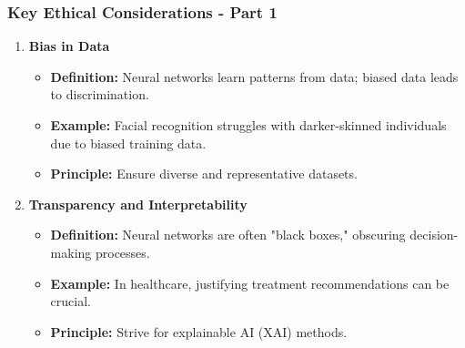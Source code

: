 \documentclass[aspectratio=169]{beamer}
\begin{document}
\begin{frame}[fragile]
    \frametitle{Key Ethical Considerations - Part 1}
    \begin{enumerate}
        \item \textbf{Bias in Data}
            \begin{itemize}
                \item \textbf{Definition:} Neural networks learn patterns from data; biased data leads to discrimination.
                \item \textbf{Example:} Facial recognition struggles with darker-skinned individuals due to biased training data.
                \item \textbf{Principle:} Ensure diverse and representative datasets.
            \end{itemize}
        
        \item \textbf{Transparency and Interpretability}
            \begin{itemize}
                \item \textbf{Definition:} Neural networks are often "black boxes," obscuring decision-making processes.
                \item \textbf{Example:} In healthcare, justifying treatment recommendations can be crucial.
                \item \textbf{Principle:} Strive for explainable AI (XAI) methods.
            \end{itemize}
    \end{enumerate}
\end{frame}
\end{document}

